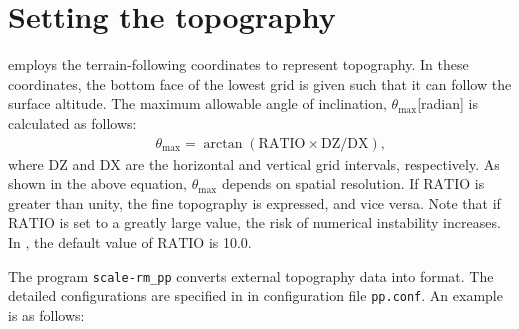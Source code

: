 \section{Setting the topography} \label{subsec:basic_usel_topo}

\scalerm employs the terrain-following coordinates to represent topography.
In these coordinates, the bottom face of the lowest grid is given such that it can follow the surface altitude. The maximum allowable angle of inclination, $\theta_{\max}$[radian] is calculated as follows:
\begin{eqnarray}
  && \theta_{\max} = \arctan( \mathrm{RATIO} \times \mathrm{DZ}/\mathrm{DX} )\nonumber,
\end{eqnarray}
where $\mathrm{DZ}$ and $\mathrm{DX}$ are the horizontal and vertical grid intervals, respectively.  As shown in the above equation, $\theta_{\max}$ depends on spatial resolution.
If $\mathrm{RATIO}$ is greater than unity, the fine topography is expressed, and vice versa. Note that if $\mathrm{RATIO}$ is set to a greatly large value, the risk of numerical instability increases.
In \scalerm, the default value of $\mathrm{RATIO}$ is 10.0.

The program \verb|scale-rm_pp| converts external topography data into \scalelib format.
The detailed configurations are specified in  in configuration file \verb|pp.conf|. An example is as follows:

